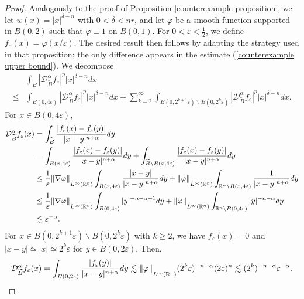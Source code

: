 \documentclass[reqno, 10pt, oneside]{amsart}
\numberwithin{equation}{section}
\newcommand{\strt}[1]{\rule{0pt}{#1}}
\renewcommand{\epsilon}{\varepsilon}
\numberwithin{theorem}{section}
\newcommand{\eps}{\varepsilon}
\renewcommand{\epsilon}{\varepsilon}
\newcommand{\R}{{\mathbb R}}
\newcommand{\1}{{\rm 1\hspace*{-0.4ex}%
\rule{0.1ex}{1.52ex}\hspace*{0.2ex}}}
\begin{document}
\begin{proof}

Analogously to the proof of Proposition \ref{counterexample proposition}, we let $w(x)=|x|^{\delta - n}$ with $0 < \delta < nr$, and let $\varphi$ be a smooth function supported in $B(0,2)$ such that $\varphi \equiv 1$ on $B(0,1)$. For $0 < \epsilon < \frac{1}{2}$, we define $f_\epsilon(x)=\varphi(x/\epsilon)$. The desired result then follows by adapting the strategy used in that proposition; the only difference appears in the estimate ({\ref{counterexample upper bound}}). We decompose 
\begin{align}
& \int_{\widetilde{B}}|\mathcal{D}^{\alpha}_{\widetilde{B}} f_\epsilon|^p |x|^{\delta -n}dx \nonumber \\
\le & \int_{B(0,4\epsilon)}|\mathcal{D}^{\alpha}_{\widetilde{B}} f_\epsilon|^p |x|^{\delta -n}dx + \sum\limits_{k=2}^{\infty}\int_{B(0,2^{k+1}\epsilon) \backslash B(0,2^k\epsilon)}|\mathcal{D}^{\alpha}_{\widetilde{B}} f_\epsilon|^p |x|^{\delta -n}dx.  \nonumber  
\end{align}
For $x \in B(0, 4\epsilon)$,
\begin{align}
\mathcal{D}^{\alpha}_{\widetilde{B}} f_\epsilon(x) & = \int_{\widetilde{B}}\frac{|f_\epsilon(x)-f_{\epsilon}(y)|}{|x-y|^{n+\alpha}} dy \nonumber \\
& = \int_{B(x,4\epsilon)}\frac{|f_\epsilon(x)-f_{\epsilon}(y)|}{|x-y|^{n+\alpha}} dy + \int_{\widetilde{B} \backslash B(x,4\epsilon)}\frac{|f_\epsilon(x)-f_{\epsilon}(y)|}{|x-y|^{n+\alpha}} dy \nonumber \\
& \le \frac{1}{\epsilon}\|\nabla \varphi\|_{\strt{2.3ex}L^{\infty}(\R^n)}\int_{B(x,4\epsilon)}\frac{|x-y|}{|x-y|^{n+\alpha}} dy + \|\varphi \|_{\strt{2.3ex} L^{\infty}(\R^n)} \int_{\R^n \backslash B(x,4\epsilon)}\frac{1}{|x-y|^{n+\alpha}} dy\nonumber \\
& \le \frac{1}{\epsilon}\|\nabla \varphi\|_{\strt{2.3ex} L^{\infty}(\R^n)}\int_{B(0,4\epsilon)}|y|^{-n-\alpha+1}dy + \|\varphi\|_{\strt{2.3ex} L^{\infty}(\R^n)} \int_{\R^n \backslash B(0,4\epsilon)}|y|^{-n-\alpha} dy\nonumber\\
& \lesssim \epsilon^{-\alpha}. \nonumber 
\end{align}
For $x \in B(0,2^{k+1}\eps)\backslash B(0,2^k\epsilon)$ with $k \ge 2$, we have $f_\varepsilon(x)=0$ and $|x-y| \simeq |x| \simeq 2^k\epsilon$ for $y \in B(0,2\epsilon)$. Then, 
$$ \mathcal{D}^{\alpha}_{\widetilde{B}} f_\epsilon(x)  = \int_{B(0,2\epsilon)}\frac{|f_{\epsilon}(y)|}{|x-y|^{n+\alpha}} dy \lesssim \|\varphi \|_{\strt{2.3ex}L^{\infty}(\R^n)}(2^k\epsilon)^{-n-\alpha}(2\epsilon)^{n} \lesssim (2^k)^{-n-\alpha}\epsilon ^{-\alpha}.$$

\end{proof}
\end{document}
